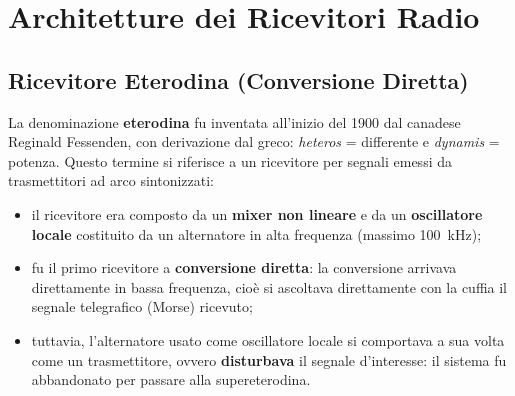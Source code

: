 \documentclass[openany,a4paper,12pt]{book}
\begin{document}
\begin{figure}[H]
\end{figure}


\section{Architetture dei Ricevitori Radio}

\subsection{Ricevitore Eterodina (Conversione Diretta)}

La denominazione \textbf{eterodina} fu inventata all'inizio del 1900 dal canadese Reginald Fessenden, con derivazione dal greco: \textit{heteros} = differente e \textit{dynamis} = potenza.
Questo termine si riferisce a un ricevitore per segnali emessi da trasmettitori ad arco sintonizzati:
\begin{itemize}[label=\textcolor{PoliBlue}{\textbullet}]
    \item il ricevitore era composto da un \textbf{mixer non lineare} e da un \textbf{oscillatore locale} costituito da un alternatore in alta frequenza (massimo \qty{100}{\kilo\hertz});
    \item fu il primo ricevitore a \textbf{conversione diretta}: la conversione arrivava direttamente in bassa frequenza, cioè si ascoltava direttamente con la cuffia il segnale telegrafico (Morse) ricevuto;
    \item tuttavia, l'alternatore usato come oscillatore locale si comportava a sua volta come un trasmettitore, ovvero \textbf{disturbava} il segnale d'interesse: il sistema fu abbandonato per passare alla supereterodina.
\end{itemize}
\end{document}
